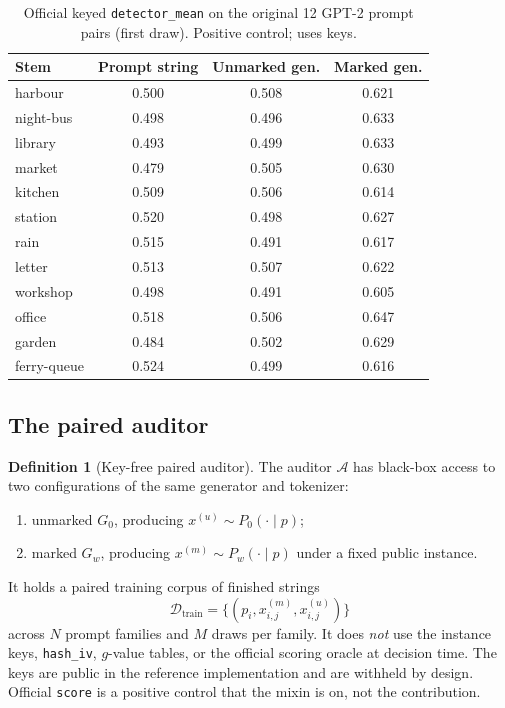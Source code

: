 \documentclass[11pt,a4paper]{article}
\theoremstyle{definition}
\newtheorem{definition}{Definition}[section]
\newcommand{\D}{\mathcal{D}}
\begin{document}
\begin{table}[t]
\centering
\small
\caption{Official keyed \texttt{detector\_mean} on the original 12
GPT-2 prompt pairs (first draw). Positive control; uses keys.}
\label{tab:official_12}
\begin{tabular}{lccc}
\toprule
Stem & Prompt string & Unmarked gen. & Marked gen. \\
\midrule
harbour      & 0.500 & 0.508 & 0.621 \\
night-bus    & 0.498 & 0.496 & 0.633 \\
library      & 0.493 & 0.499 & 0.633 \\
market       & 0.479 & 0.505 & 0.630 \\
kitchen      & 0.509 & 0.506 & 0.614 \\
station      & 0.520 & 0.498 & 0.627 \\
rain         & 0.515 & 0.491 & 0.617 \\
letter       & 0.513 & 0.507 & 0.622 \\
workshop     & 0.498 & 0.491 & 0.605 \\
office       & 0.518 & 0.506 & 0.647 \\
garden       & 0.484 & 0.502 & 0.629 \\
ferry-queue  & 0.524 & 0.499 & 0.616 \\
\bottomrule
\end{tabular}
\end{table}

\subsection{The paired auditor}

\begin{definition}[Key-free paired auditor]
\label{def:auditor}
The auditor $\mathcal{A}$ has black-box access to two configurations of
the same generator and tokenizer:
\begin{enumerate}[label=(\roman*)]
\item unmarked $G_0$, producing $x^{(u)}\sim P_0(\cdot \mid p)$;
\item marked $G_w$, producing $x^{(m)}\sim P_w(\cdot \mid p)$ under a
fixed public instance.
\end{enumerate}
It holds a paired training corpus of finished strings
\[
\D_{\mathrm{train}}
= \bigl\{(p_i, x_{i,j}^{(m)}, x_{i,j}^{(u)})\bigr\}
\]
across $N$ prompt families and $M$ draws per family. It does
\emph{not} use the instance keys, \texttt{hash\_iv}, $g$-value tables,
or the official scoring oracle at decision time. The keys are public in
the reference implementation and are withheld by design. Official
\texttt{score} is a positive control that the mixin is on, not the
contribution.
\end{definition}
\end{document}

